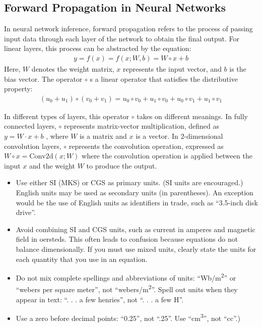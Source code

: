 \documentclass[conference]{IEEEtran}
\begin{document}
\subsection{Forward Propagation in Neural Networks}

In neural network inference, forward propagation refers to the process of passing input data through each layer of the network to obtain the final output. For linear layers, this process can be abstracted by the equation:
\begin{equation*}
\begin{array}{c}
       y=f(x)=f(x;W,b)=W\circ x+b
\end{array}
\end{equation*}
Here, $W$ denotes the weight matrix, $x$ represents the input vector, and $b$ is the bias vector. The operator $\circ$ s a linear operator that satisfies the distributive property:
\begin{equation*}
\begin{array}{c}
       (u_0+u_1) \circ (v_0+v_1)=u_0 \circ v_0+u_1 \circ v_0+ u_0\circ v_1+ u_1\circ v_1
\end{array}
\end{equation*}

In different types of layers, this operator $\circ$ takes on different meanings. In fully connected layers, $\circ$ represents matrix-vector multiplication, defined as $y=W·x+b$ , where $W$ is a matrix and $x$ is a vector. In 2-dimensional convolution layers, $\circ$ represents the convolution operation, expressed as $W\circ x=\text{Conv}2\text{d}(x;W)$ where the convolution operation is applied between the input $x$ and the weight $W$ to produce the output.


\begin{itemize}
\item Use either SI (MKS) or CGS as primary units. (SI units are encouraged.) English units may be used as secondary units (in parentheses). An exception would be the use of English units as identifiers in trade, such as ``3.5-inch disk drive''.
\item Avoid combining SI and CGS units, such as current in amperes and magnetic field in oersteds. This often leads to confusion because equations do not balance dimensionally. If you must use mixed units, clearly state the units for each quantity that you use in an equation.
\item Do not mix complete spellings and abbreviations of units: ``Wb/m\textsuperscript{2}'' or ``webers per square meter'', not ``webers/m\textsuperscript{2}''. Spell out units when they appear in text: ``. . . a few henries'', not ``. . . a few H''.
\item Use a zero before decimal points: ``0.25'', not ``.25''. Use ``cm\textsuperscript{3}'', not ``cc''.)
\end{itemize}
\end{document}
